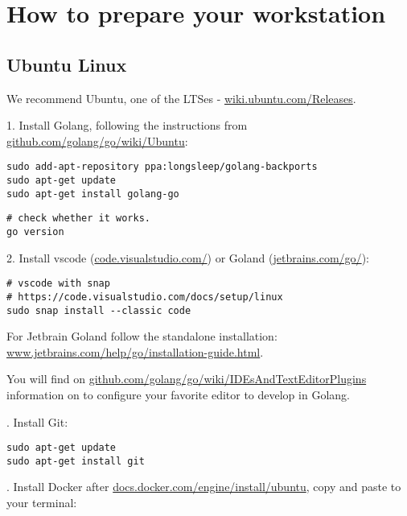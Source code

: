 \documentclass[11pt, letterpaper]{article}
\begin{document}
\section{How to prepare your workstation}

\subsection{Ubuntu Linux}

We recommend Ubuntu, one of the LTSes - \href{https://wiki.ubuntu.com/Releases}{wiki.ubuntu.com/Releases}.
\bigskip

1. Install Golang, following the instructions from \href{https://github.com/golang/go/wiki/Ubuntu}{github.com/golang/go/wiki/Ubuntu}:

\begin{verbatim}
sudo add-apt-repository ppa:longsleep/golang-backports
sudo apt-get update
sudo apt-get install golang-go
\end{verbatim}

\begin{verbatim}
# check whether it works.
go version
\end{verbatim}
\bigskip

2. Install vscode (\href{https://code.visualstudio.com/}{code.visualstudio.com/}) or Goland (\href{https://www.jetbrains.com/go/}{jetbrains.com/go/}):

\begin{verbatim}
# vscode with snap
# https://code.visualstudio.com/docs/setup/linux
sudo snap install --classic code
\end{verbatim}

For Jetbrain Goland follow the standalone installation:\\
\href{https://www.jetbrains.com/help/go/installation-guide.html#c2dfc2}{www.jetbrains.com/help/go/installation-guide.html}.

\smallskip
You will find on \href{https://github.com/golang/go/wiki/IDEsAndTextEditorPlugins}{github.com/golang/go/wiki/IDEsAndTextEditorPlugins} information on to configure your favorite editor to develop in Golang.

. Install Git:

\begin{verbatim}
sudo apt-get update
sudo apt-get install git
\end{verbatim}

. Install Docker after \href{https://docs.docker.com/engine/install/ubuntu/#install-using-the-repository}{docs.docker.com/engine/install/ubuntu}, copy and paste to your terminal:
\end{document}
